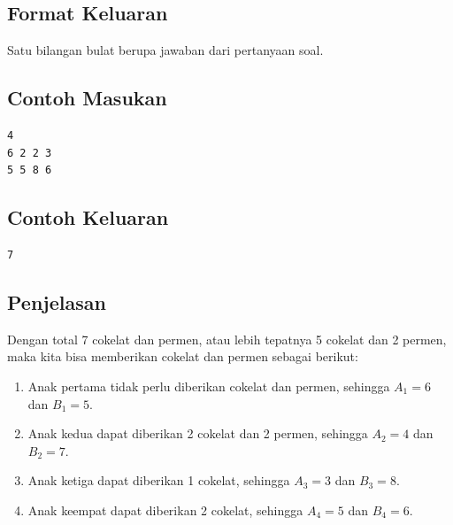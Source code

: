 \documentclass{article}
\begin{document}
\subsection*{Format Keluaran}

Satu bilangan bulat berupa jawaban dari pertanyaan soal.

\begin{multicols}{2}
\subsection*{Contoh Masukan}
\begin{lstlisting}
4
6 2 2 3
5 5 8 6
\end{lstlisting}
\columnbreak
\subsection*{Contoh Keluaran}
\begin{lstlisting}
7
\end{lstlisting}
\vfill
\null
\end{multicols}

\subsection*{Penjelasan}

Dengan total 7 cokelat dan permen, atau lebih tepatnya 5 cokelat dan 2 permen, maka kita bisa memberikan cokelat dan permen sebagai berikut:
\begin{enumerate}
\item Anak pertama tidak perlu diberikan cokelat dan permen, sehingga $A_1=6$ dan $B_1=5$.
\item Anak kedua dapat diberikan 2 cokelat dan 2 permen, sehingga $A_2=4$ dan $B_2=7$.
\item Anak ketiga dapat diberikan 1 cokelat, sehingga $A_3=3$ dan $B_3=8$.
\item Anak keempat dapat diberikan 2 cokelat, sehingga $A_4=5$ dan $B_4=6$.
\end{enumerate}


\pagebreak
\end{document}
